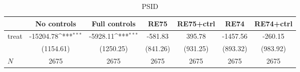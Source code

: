 \begin{table}[htbp]\centering
\def\sym#1{\ifmmode^{#1}\else\(^{#1}\)\fi}
\caption{PSID}
\begin{tabular}{l*{6}{c}}
\hline\hline
            &\multicolumn{1}{c}{No controls}&\multicolumn{1}{c}{Full controls}&\multicolumn{1}{c}{RE75}&\multicolumn{1}{c}{RE75+ctrl}&\multicolumn{1}{c}{RE74}&\multicolumn{1}{c}{RE74+ctrl}\\
\hline
treat       &   -15204.78\sym{***}&    -5928.11\sym{***}&     -581.83         &      395.78         &    -1457.56         &     -260.15         \\
            &   (1154.61)         &   (1250.25)         &    (841.26)         &    (931.25)         &    (893.32)         &    (983.92)         \\
\hline
\(N\)       &        2675         &        2675         &        2675         &        2675         &        2675         &        2675         \\
\hline\hline
\end{tabular}
\end{table}
